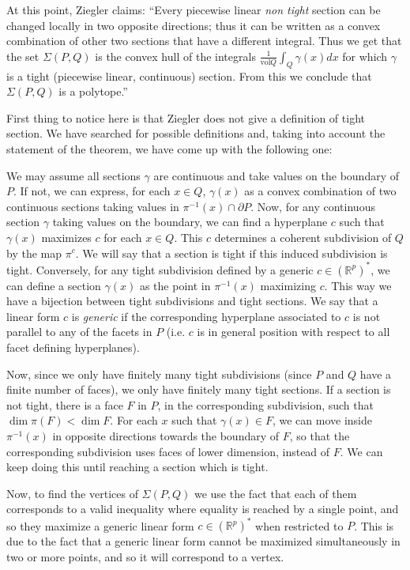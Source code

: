 \documentclass[12pt,a4paper]{article}
\newcommand{\RR}{\mathbb{R}}
\newcommand{\vol}{\text{vol}}
\begin{document}
At this point, Ziegler claims: ``Every piecewise linear \textit{non tight} section can be changed locally in two opposite directions; thus it can be written as a convex combination of other two sections that have a different integral. Thus we get that the set $\Sigma(P, Q)$ is the convex hull of the integrals $\frac{1}{\vol Q}\int_Q \gamma(x)dx$ for which $\gamma$ is a tight (piecewise linear, continuous) section. From this we conclude that $\Sigma(P, Q)$ is a polytope.''

First thing to notice here is that Ziegler does not give a definition of tight section. 
We have searched for possible definitions and, taking into account the statement of the theorem, we have come up with the following one: 

We may assume all sections $\gamma$ are continuous and take values on the boundary of $P$. If not, we can express, for each $x\in Q$, $\gamma(x)$ as a convex combination of two continuous sections taking values in $\pi^{-1}(x) \cap \partial P$. 
Now, for any continuous section $\gamma$ taking values on the boundary, we can find a hyperplane $c$ such that $\gamma(x)$ maximizes $c$ for each $x\in Q$. This $c$ determines a coherent subdivision of $Q$ by the map $\pi^c$. We will say that a section is tight if this induced subdivision is tight. 
Conversely, for any tight subdivision defined by a generic $c\in (\RR^p)^*$, we can define a section $\gamma(x)$ as the point in $\pi^{-1}(x)$ maximizing $c$. This way we have a bijection between tight subdivisions and tight sections.
We say that a linear form $c$ is \textit{generic} if the corresponding hyperplane associated to $c$ is not parallel to any of the facets in $P$ (i.e. $c$ is in general position with respect to all facet defining hyperplanes). 

Now, since we only have finitely many tight subdivisions (since $P$ and $Q$ have a finite number of faces), we only have finitely many tight sections.
If a section is not tight, there is a face $F$ in $P$, in the corresponding subdivision, such that $\dim \pi(F) < \dim F$. 
For each $x$ such that $\gamma(x)\in F$, we can move inside $\pi^{-1}(x)$ in opposite directions towards the boundary of $F$, so that the corresponding subdivision uses faces of lower dimension, instead of $F$. We can keep doing this until reaching a section which is tight. 

Now, to find the vertices of $\Sigma(P,Q)$ we use the fact that each of them corresponds to a valid inequality where equality is reached by a single point, and so they maximize a generic linear form $c\in (\RR^p)^*$ when restricted to $P$. 
This is due to the fact that a generic linear form cannot be maximized simultaneously in two or more points, and so it will correspond to a vertex. 
\end{document}
